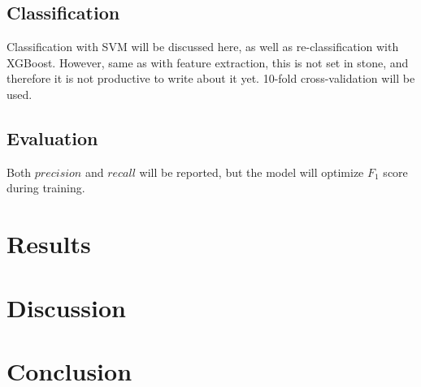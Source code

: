\documentclass[twocolumn, 12pt]{article}
\begin{document}
\subsection{Classification}
Classification with SVM will be discussed here, as well as re-classification with XGBoost.
However, same as with feature extraction, this is not set in stone, and therefore it is not productive to write about it yet.
10-fold cross-validation will be used.

\subsection{Evaluation}
Both $precision$ and $recall$ will be reported, but the model will optimize $F_1$ score during training.

\section{Results}
\section{Discussion}
\section{Conclusion}
\newpage


\end{document}
